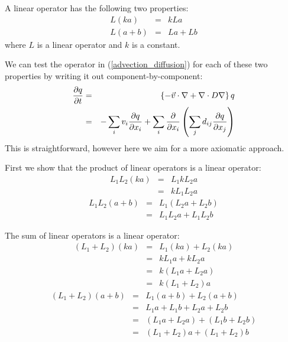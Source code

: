 

\label{linearity}


A linear operator has the following two properties:
\begin{eqnarray}
	L(ka) & = & kLa \\
	L(a+b) & = & La + Lb
\end{eqnarray}
where $L$ is a linear operator and $k$ is a constant.

We can test the operator in (\ref{advection_diffusion}) for each of these two
properties by writing it out component-by-component:
\begin{eqnarray}
	\frac{\partial q}{\partial t} & = & \left \lbrace -\vec{v} \cdot \nabla + \nabla \cdot D \nabla \right \rbrace q \\
				   & = & - \sum_i v_i \frac{\partial q}{\partial x_i} + \sum_i \frac{\partial}{\partial x_i} \left ( \sum_j d_{ij} \frac{\partial q}{\partial x_j} \right )
\end{eqnarray}
This is straightforward, however here we aim for a more axiomatic approach.

First we show that the product of linear operators is a linear operator:
\begin{eqnarray}
	L_1 L_2 (ka) & = & L_1 k L_2 a \\
		    & = & k L_1 L_2 a
\end{eqnarray}
\begin{eqnarray}
	L_1 L_2 (a+b) & = & L_1 (L_2 a + L_2 b) \\
		    & = & L_1 L_2 a + L_1 L_2 b
\end{eqnarray}

The sum of linear operators is a linear operator:
\begin{eqnarray}
	(L_1 + L_2) (ka) & = & L_1 (ka) + L_2 (ka) \\
		    & = & k L_1 a + k L_2 a \\
	     & = & k (L_1 a + L_2 a) \\
	     & = & k (L_1 + L_2) a
\end{eqnarray}
\begin{eqnarray}
	(L_1 + L_2) (a + b) & = & L_1 (a + b) + L_2 (a + b) \\
		    & = & L_1 a + L_1 b + L_2 a + L_2 b \\
	     & = & (L_1 a + L_2 a) + (L_1 b + L_2 b) \\
	     & = & (L_1 + L_2) a + (L_1 + L_2) b
\end{eqnarray}

